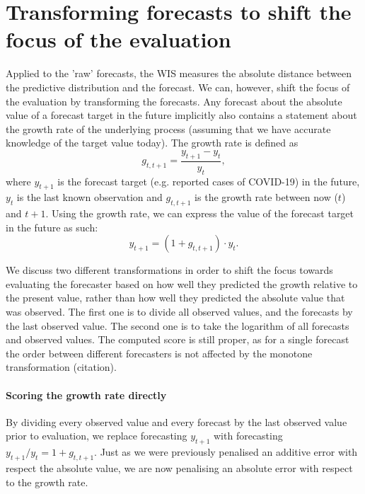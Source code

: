 \documentclass{article}
\begin{document}
\section{Transforming forecasts to shift the focus of the evaluation}

Applied to the 'raw' forecasts, the WIS measures the absolute distance between the predictive distribution and the forecast. We can, however, shift the focus of the evaluation by transforming the forecasts. 
Any forecast about the absolute value of a forecast target in the future implicitly also contains a statement about the growth rate of the underlying process (assuming that we have accurate knowledge of the target value today). The growth rate is defined as 
%
\begin{equation}
    g_{t, t+1} = \frac{y_{t+1} - y_t}{y_t},
\end{equation}
%
where $y_{t+1}$ is the forecast target (e.g. reported cases of COVID-19) in the future, $y_t$ is the last known observation and $g_{t, t+1}$ is the growth rate between now ($t$) and $t+1$. 
Using the growth rate, we can express the value of the forecast target in the future as such: 
%
\begin{equation}
y_{t+1} = (1 + g_{t, t+1}) \cdot y_t.
\end{equation}
%

We discuss two different transformations in order to shift the focus towards evaluating the forecaster based on how well they predicted the growth relative to the present value, rather than how well they predicted the absolute value that was observed. The first one is to divide all observed values, and the forecasts by the last observed value. The second one is to take the logarithm of all forecasts and observed values. The computed score is still proper, as for a single forecast the order between different forecasters is not affected by the monotone transformation (citation).

\paragraph{Scoring the growth rate directly}
By dividing every observed value and every forecast by the last observed value prior to evaluation, we replace forecasting $y_{t+1}$ with forecasting  $y_{t+1} / y_t = 1 + g_{t, t+1}$. Just as we were previously penalised an additive error with respect the absolute value, we are now penalising an absolute error with respect to the growth rate. 
\end{document}
